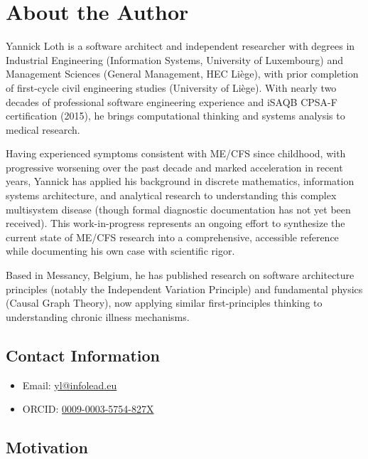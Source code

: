\chapter*{About the Author}

Yannick Loth is a software architect and independent researcher with degrees in Industrial Engineering (Information Systems, University of Luxembourg) and Management Sciences (General Management, HEC Liège), with prior completion of first-cycle civil engineering studies (University of Liège). With nearly two decades of professional software engineering experience and iSAQB CPSA-F certification (2015), he brings computational thinking and systems analysis to medical research.

Having experienced symptoms consistent with ME/CFS since childhood, with progressive worsening over the past decade and marked acceleration in recent years, Yannick has applied his background in discrete mathematics, information systems architecture, and analytical research to understanding this complex multisystem disease (though formal diagnostic documentation has not yet been received). This work-in-progress represents an ongoing effort to synthesize the current state of ME/CFS research into a comprehensive, accessible reference while documenting his own case with scientific rigor.

Based in Messancy, Belgium, he has published research on software architecture principles (notably the Independent Variation Principle) and fundamental physics (Causal Graph Theory), now applying similar first-principles thinking to understanding chronic illness mechanisms.

\section*{Contact Information}

\begin{itemize}
    \item Email: \href{mailto:yl@infolead.eu}{yl@infolead.eu}
    \item ORCID: \href{https://orcid.org/0009-0003-5754-827X}{0009-0003-5754-827X}
\end{itemize}

\section*{Motivation}

